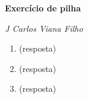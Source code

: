 \documentclass[a4paper,11pt]{article}
\begin{document}
\begin{flushright}
\makeatletter
\textit{\@date}
\makeatother
\end{flushright}

\begin{center}
{\Large \textbf{Exercício de pilha}}
\end{center}

\textit{J Carlos Viana Filho}


\begin{enumerate}

\item (resposta)


\item (resposta)


\item (resposta)


\end{enumerate}
\end{document}
